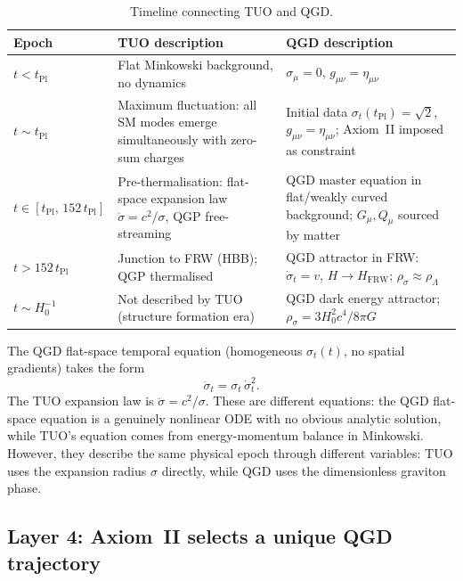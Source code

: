 \documentclass[11pt,a4paper]{article}
\theoremstyle{plain}
\theoremstyle{definition}
\theoremstyle{remark}
\begin{document}
\begin{table}[h]
\centering
\caption{Timeline connecting TUO and QGD.}
\label{tab:timeline}
\begin{tabular}{@{}p{2.8cm}p{4.5cm}p{4.5cm}@{}}
\toprule
Epoch & TUO description & QGD description \\
\midrule
$t < t_\mathrm{Pl}$ &
  Flat Minkowski background, no dynamics &
  $\sigma_\mu = 0$, $g_{\mu\nu} = \eta_{\mu\nu}$ \\[4pt]
$t \sim t_\mathrm{Pl}$ &
  Maximum fluctuation: all SM modes emerge simultaneously with zero-sum charges &
  Initial data $\sigma_t(t_\mathrm{Pl}) = \sqrt{2}$, $g_{\mu\nu} = \eta_{\mu\nu}$;
  Axiom~II imposed as constraint \\[4pt]
$t \in [t_\mathrm{Pl},\, 152\,t_\mathrm{Pl}]$ &
  Pre-thermalisation: flat-space expansion law $\ddot\sigma = c^2/\sigma$,
  QGP free-streaming &
  QGD master equation in flat/weakly curved background;
  $G_\mu, Q_\mu$ sourced by matter \\[4pt]
$t > 152\,t_\mathrm{Pl}$ &
  Junction to FRW (HBB); QGP thermalised &
  QGD attractor in FRW: $\dot\sigma_t = v$,
  $H \to H_\mathrm{FRW}$;
  $\rho_\sigma \approx \rho_\Lambda$ \\[4pt]
$t \sim H_0^{-1}$ &
  Not described by TUO (structure formation era) &
  QGD dark energy attractor;
  $\rho_\sigma = 3H_0^2c^4/8\pi G$ \\
\bottomrule
\end{tabular}
\end{table}

The QGD flat-space temporal equation (homogeneous $\sigma_t(t)$, no spatial
gradients) takes the form
\begin{equation}\label{eq:qgd_flat_temporal}
  \ddot\sigma_t = \sigma_t\,\dot\sigma_t^2.
\end{equation}
The TUO expansion law is $\ddot\sigma = c^2/\sigma$.  These are different
equations: the QGD flat-space equation is a genuinely nonlinear ODE with no
obvious analytic solution, while TUO's equation comes from energy-momentum
balance in Minkowski.  However, they describe the same physical epoch through
different variables: TUO uses the expansion radius $\sigma$ directly, while
QGD uses the dimensionless graviton phase.

\subsection{Layer 4: Axiom~II selects a unique QGD trajectory}
\end{document}
